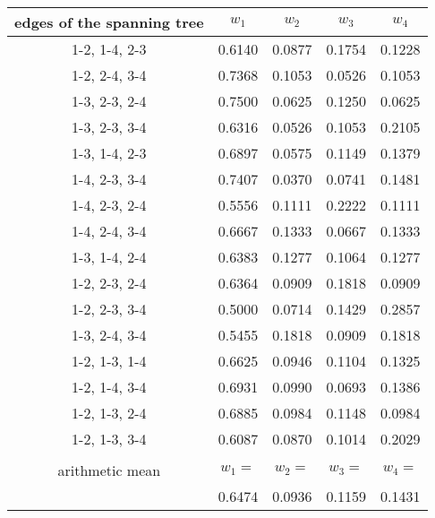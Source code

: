 \documentclass{article}
\theoremstyle{plain}
\begin{document}
\begin{center}
\begin{tabular}{|c|c|c|c|c|}
\hline  %
 edges of the spanning tree                & $w_1$ & $w_2$ & $w_3$ & $w_4$ \\
\hline
1-2, 1-4, 2-3   &   0.6140 &  0.0877 & 0.1754 & 0.1228  \\  %
\hline
1-2, 2-4, 3-4   &   0.7368 &  0.1053 & 0.0526 & 0.1053  \\  %
\hline
1-3, 2-3, 2-4   &   0.7500 &  0.0625 & 0.1250 & 0.0625  \\  %
\hline
1-3, 2-3, 3-4   &   0.6316 &  0.0526 & 0.1053 & 0.2105  \\  %
\hline
1-3, 1-4, 2-3   &   0.6897 &  0.0575 & 0.1149 & 0.1379  \\  %
\hline
1-4, 2-3, 3-4   &   0.7407 &  0.0370 & 0.0741 & 0.1481  \\  %
\hline
1-4, 2-3, 2-4   &   0.5556 &  0.1111 & 0.2222 & 0.1111  \\  %
\hline
1-4, 2-4, 3-4   &   0.6667 &  0.1333 & 0.0667 & 0.1333  \\  %
\hline
1-3, 1-4, 2-4   &   0.6383 &  0.1277 & 0.1064 & 0.1277  \\  %
\hline
1-2, 2-3, 2-4   &   0.6364 &  0.0909 & 0.1818 & 0.0909  \\  %
\hline
1-2, 2-3, 3-4   &   0.5000 &  0.0714 & 0.1429 & 0.2857  \\  %
\hline
1-3, 2-4, 3-4   &   0.5455 &  0.1818 & 0.0909 & 0.1818  \\  %
\hline
1-2, 1-3, 1-4   &   0.6625 &  0.0946 & 0.1104 & 0.1325  \\  %
\hline
1-2, 1-4, 3-4   &   0.6931 &  0.0990 & 0.0693 & 0.1386  \\  %
\hline
1-2, 1-3, 2-4   &   0.6885 &  0.0984 & 0.1148 & 0.0984  \\  %
\hline
1-2, 1-3, 3-4   &   0.6087 &  0.0870 & 0.1014 & 0.2029  \\  %
\hline
\hline
                &          &         &        &         \\
arithmetic mean & ${w}_1=$ & ${w}_2=$  & ${w}_3=$  & ${w}_4=$  \\
                &   0.6474 &  0.0936 & 0.1159 & 0.1431  \\
\hline
\end{tabular}
\end{center}
\end{document}
